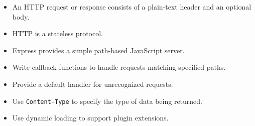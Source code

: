 \begin{itemize}
\item
  An HTTP request or response consists of a plain-text header and an optional body.
\item
  HTTP is a stateless protocol.
\item
  Express provides a simple path-based JavaScript server.
\item
  Write callback functions to handle requests matching specified paths.
\item
  Provide a default handler for unrecognized requests.
\item
  Use \texttt{Content-Type} to specify the type of data being returned.
\item
  Use dynamic loading to support plugin extensions.
\end{itemize}
